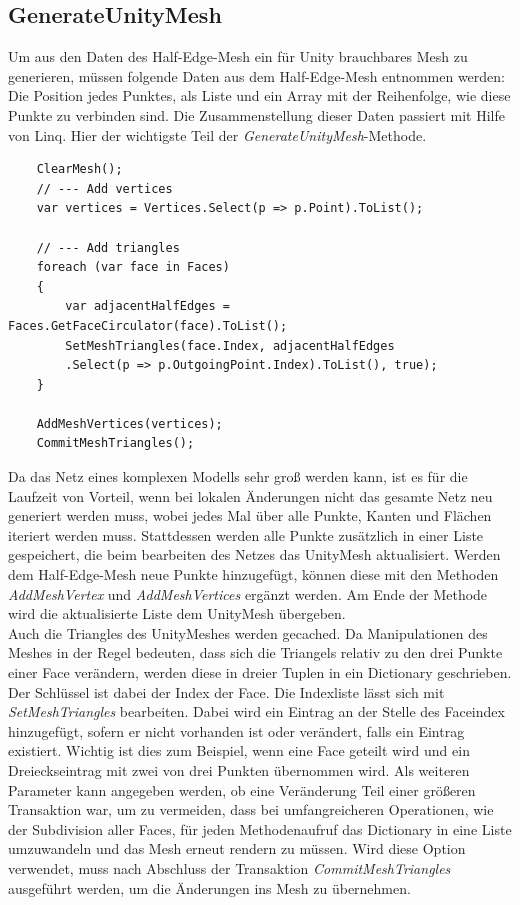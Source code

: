 \subsection{GenerateUnityMesh}
Um aus den Daten des Half-Edge-Mesh ein f\"ur Unity brauchbares Mesh zu generieren, m\"ussen folgende Daten aus dem Half-Edge-Mesh entnommen werden: Die Position jedes Punktes, als Liste und ein Array mit der Reihenfolge, wie diese Punkte zu verbinden sind. Die Zusammenstellung dieser Daten passiert mit Hilfe von Linq. Hier der wichtigste Teil der \textit{GenerateUnityMesh}-Methode.
\begin{lstlisting}
	ClearMesh();
	// --- Add vertices
	var vertices = Vertices.Select(p => p.Point).ToList();

	// --- Add triangles
	foreach (var face in Faces)
	{
		var adjacentHalfEdges = Faces.GetFaceCirculator(face).ToList();
		SetMeshTriangles(face.Index, adjacentHalfEdges
		.Select(p => p.OutgoingPoint.Index).ToList(), true);
	}

	AddMeshVertices(vertices);
	CommitMeshTriangles();
\end{lstlisting}
Da das Netz eines komplexen Modells sehr gro{\ss} werden kann, ist es f\"ur die Laufzeit von Vorteil, wenn bei lokalen \"Anderungen nicht das gesamte Netz neu generiert werden muss, wobei jedes Mal \"uber alle Punkte, Kanten und Fl\"achen iteriert werden muss. Stattdessen werden alle Punkte zus\"atzlich in einer Liste gespeichert, die beim bearbeiten des Netzes das UnityMesh aktualisiert. Werden dem Half-Edge-Mesh neue Punkte hinzugef\"ugt, k\"onnen diese mit den Methoden \textit{AddMeshVertex} und \textit{AddMeshVertices} erg\"anzt werden. Am Ende der Methode wird die aktualisierte Liste dem UnityMesh \"ubergeben. 
\\
Auch die Triangles des UnityMeshes werden gecached. Da Manipulationen des Meshes in der Regel bedeuten, dass sich die Triangels relativ zu den drei Punkte einer Face ver\"andern, werden diese in dreier Tuplen in ein Dictionary geschrieben. Der Schl\"ussel ist dabei der Index der Face. Die Indexliste l\"asst sich mit \textit{SetMeshTriangles} bearbeiten. Dabei wird ein Eintrag an der Stelle des Faceindex hinzugef\"ugt, sofern er nicht vorhanden ist oder ver\"andert, falls ein Eintrag existiert. Wichtig ist dies zum Beispiel, wenn eine Face geteilt wird und ein Dreieckseintrag mit zwei von drei Punkten \"ubernommen wird. Als weiteren Parameter kann angegeben werden, ob eine Ver\"anderung Teil einer gr\"o{\ss}eren Transaktion war, um zu vermeiden, dass bei umfangreicheren Operationen, wie der Subdivision aller Faces, f\"ur jeden Methodenaufruf das Dictionary in eine Liste umzuwandeln und das Mesh erneut rendern zu m\"ussen. Wird diese Option verwendet, muss nach Abschluss der Transaktion \textit{CommitMeshTriangles} ausgef\"uhrt werden, um die \"Anderungen ins Mesh zu \"ubernehmen.
